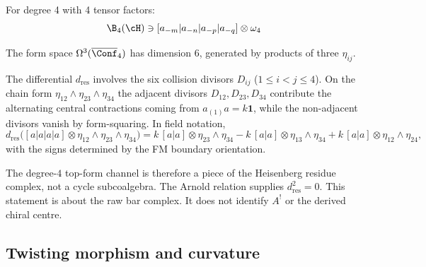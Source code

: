 \begin{computation}\label{comp:heisenberg-deg4}
For degree 4 with 4 tensor factors:
\[
\B_4(\cH) \ni [a_{-m}|a_{-n}|a_{-p}|a_{-q}] \otimes \omega_4
\]

The form space $\Omega^3(\overline{\Conf}_4)$ has dimension 6, generated by
products of three $\eta_{ij}$.

The differential $d_{\text{res}}$ involves the six collision divisors
$D_{ij}$ ($1 \leq i < j \leq 4$). On the chain form
$\eta_{12}\wedge\eta_{23}\wedge\eta_{34}$ the adjacent divisors
$D_{12},D_{23},D_{34}$ contribute the alternating central contractions
coming from $a_{(1)}a=k\mathbf 1$, while the non-adjacent divisors
vanish by form-squaring. In field notation,
\[
d_{\mathrm{res}}\bigl([a|a|a|a]\otimes
\eta_{12}\wedge\eta_{23}\wedge\eta_{34}\bigr)
 =
k\,[a|a]\otimes\eta_{23}\wedge\eta_{34}
-k\,[a|a]\otimes\eta_{13}\wedge\eta_{34}
+k\,[a|a]\otimes\eta_{12}\wedge\eta_{24},
\]
with the signs determined by the FM boundary orientation.

The degree-$4$ top-form channel is therefore a piece of the
Heisenberg residue complex, not a cycle subcoalgebra. The Arnold
relation supplies $d_{\mathrm{res}}^2=0$. This statement is about
the raw bar complex. It does not identify $A^!$ or the derived
chiral centre.
\end{computation}


\subsection{Twisting morphism and curvature}

